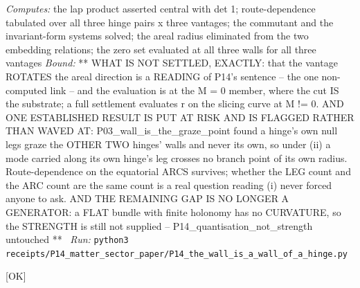 \begin{description}
\emph{Computes:} the lap product asserted central with det 1; route-dependence tabulated over all three hinge pairs x three vantages; the commutant and the invariant-form systems solved; the areal radius eliminated from the two embedding relations; the zero set evaluated at all three walls for all three vantages
 \emph{Bound:} ** WHAT IS NOT SETTLED, EXACTLY: that the vantage ROTATES the areal direction is a READING of P14's sentence -- the one non-computed link -- and the evaluation is at the M = 0 member, where the cut IS the substrate; a full settlement evaluates r on the slicing curve at M != 0. AND ONE ESTABLISHED RESULT IS PUT AT RISK AND IS FLAGGED RATHER THAN WAVED AT: P03\_wall\_is\_the\_graze\_point found a hinge's own null legs graze the OTHER TWO hinges' walls and never its own, so under (ii) a mode carried along its own hinge's leg crosses no branch point of its own radius. Route-dependence on the equatorial ARCS survives; whether the LEG count and the ARC count are the same count is a real question reading (i) never forced anyone to ask. AND THE REMAINING GAP IS NO LONGER A GENERATOR: a FLAT bundle with finite holonomy has no CURVATURE, so the STRENGTH is still not supplied -- P14\_quantisation\_not\_strength untouched **
\ \emph{Run:} \texttt{python3 receipts/P14\_matter\_sector\_paper/P14\_the\_wall\_is\_a\_wall\_of\_a\_hinge.py}
\item[\rcptlabel{P14_leg_count_equals_arc_count}{P14R29}\textbf{P14R29}\quad\texttt{P14\_leg\_count\_equals\_arc\_count}]\hfill\textsf{[OK]}\\

\end{description}
